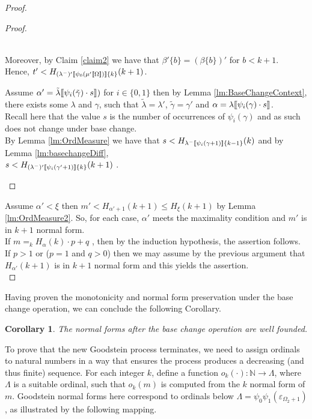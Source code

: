 \documentclass{amsart}
\theoremstyle{plain}
\theoremstyle{plain}
\newtheorem{corollary}[theorem]{Corollary}
\def\scbrl{[\hspace{-.14em}[}
\def\scbrr{]\hspace{-.14em}]}
\def\scbr#1{\scbrl#1\scbrr}
\newcommand{\Om}{{\Omega}}
\newcommand{\ok}{o_{k}}
\newcommand{\al}{{\alpha}}
\newcommand{\be}{{\beta}}
\newcommand{\ga}{\gamma}
\newcommand{\la}{\lambda}
\def\scbrl{[\hspace{-.14em}[}
\def\scbrr{]\hspace{-.14em}]}
\def\scbr#1{\scbrl#1\scbrr}
\begin{document}
\begin{proof}
\begin{proof}
\begin{Cases}
        \medskip\\
        Moreover, by Claim \ref{claim2} we have that $\be'\{b\} =( \be\{b\})'$ for $b < k+1$.
        \smallskip\\
        Hence,  $t'< H_{(\la^-)'\scbr{\psi_0(\mu'\scbr{\Om})}\{k\}}(k+1)$.
        \medskip
        \item Assume $\al'=\tilde{\la}\scbr{\psi_i(\tilde{\ga})\cdot s})$ for $i\in \{0,1\}$ then by Lemma \ref{lm:BaseChangeContext}, there exists some $\la$ and $\ga$, such that $\tilde{\la}=\la'$, $\tilde{\ga} =\ga'$ and $\al=\la\scbr{\psi_i(\ga)\cdot s}$.
        \medskip\\
        Recall here that the value  $s$ is the number of occurrences of $\psi_i(\ga)$ and as such does not change under base change.
        \medskip\\
        By Lemma \ref{lm:OrdMeasure} we have that $s<H_{\la^-\scbr{\psi_i(\ga+1)}\{k-1\}}(k)$ and by Lemma \ref{lm:basechangeDiff},\medskip\\
        $s < H_{(\la^-)'\scbr{\psi_i(\ga'+1)}\{k\}}(k+1)$ .
    \end{Cases}
\end{proof}
Assume $\al'<\xi$ then $m'<H_{\al'+1}(k+1)\leq H_\xi(k+1)$ by Lemma \ref{lm:OrdMeasure2}.
So, for each case, $\al'$ meets the maximality condition and $m'$ is in $k+1$ normal form.\\
If $m=_k H_\al(k)\cdot p +q$ , then by the induction hypothesis, the assertion follows.\medskip
\\
If $p>1$ or ($p=1$ and $q>0$) then we may assume by the previous argument that $H_{\al'}(k+1)$ is in $k+1$ normal form and this yields the assertion.\\
\end{proof}

Having proven the monotonicity and normal form preservation under the base change operation, we can conclude the following Corollary.
\begin{corollary}
    The normal forms after the base change operation are well founded.
\end{corollary}

\smallskip
To prove that the new Goodstein process terminates, we need to assign ordinals to natural numbers in a way that ensures the process produces a decreasing (and thus finite) sequence. For each integer $k$, define a function $\ok(\cdot): \mathbb{N} \to \Lambda$, where $\Lambda$ is a suitable ordinal, such that $\ok(m)$ is computed from the $k$ normal form of $m$. 
Goodstein normal forms here correspond to ordinals below $\Lambda = \psi_0\psi_1(\varepsilon_{\Om_2+1})$, as illustrated by the following mapping.
\end{document}
